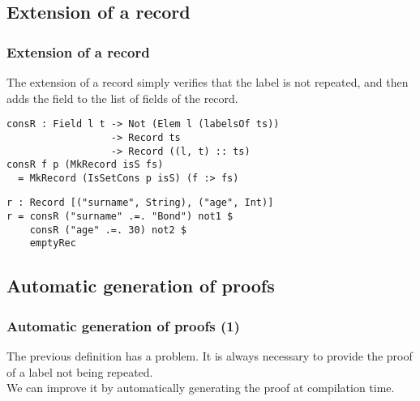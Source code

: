 \documentclass{beamer}
\begin{document}
\subsection{Extension of a record}

\begin{frame}[fragile]
\frametitle{Extension of a record}

The extension of a record simply verifies that the label is not repeated, and then adds the field to the list of fields of the record.

\pause

\begin{definition}
\begin{verbatim}
consR : Field l t -> Not (Elem l (labelsOf ts))
                  -> Record ts
                  -> Record ((l, t) :: ts)
consR f p (MkRecord isS fs)
  = MkRecord (IsSetCons p isS) (f :> fs)
\end{verbatim}
\end{definition}

\pause
\begin{example}
\begin{verbatim}
r : Record [("surname", String), ("age", Int)]
r = consR ("surname" .=. "Bond") not1 $
    consR ("age" .=. 30) not2 $
    emptyRec
\end{verbatim}
\end{example}
\end{frame}

\subsection{Automatic generation of proofs}

\begin{frame}[fragile]
\frametitle{Automatic generation of proofs (1)}

The previous definition has a problem. It is always necessary to provide the proof of a label not being repeated. \\

We can improve it by automatically generating the proof at compilation time.

\end{frame}
\end{document}
